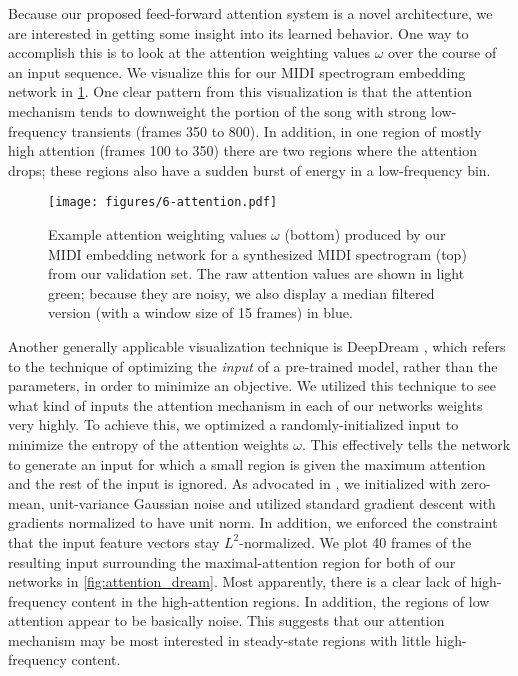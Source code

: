Because our proposed feed-forward attention system is a novel architecture, we are interested in getting some insight into its learned behavior.
One way to accomplish this is to look at the attention weighting values $\omega$ over the course of an input sequence.
We visualize this for our MIDI spectrogram embedding network in \cref{fig:attention}.
One clear pattern from this visualization is that the attention mechanism tends to downweight the portion of the song with strong low-frequency transients (frames 350 to 800).
In addition, in one region of mostly high attention (frames 100 to 350) there are two regions where the attention drops; these regions also have a sudden burst of energy in a low-frequency bin.

\begin{figure}
  \texttt{[image: figures/6-attention.pdf]}
  \caption[Example attention weighting]{Example attention weighting values $\omega$ (bottom) produced by our MIDI embedding network for a synthesized MIDI spectrogram (top) from our validation set.
The raw attention values are shown in light green; because they are noisy, we also display a median filtered version (with a window size of 15 frames) in blue.}
  \label{fig:attention}
\end{figure}

Another generally applicable visualization technique is DeepDream \cite{mordvintsev2015inceptionism}, which refers to the technique of optimizing the {\em input} of a pre-trained model, rather than the parameters, in order to minimize an objective.
We utilized this technique to see what kind of inputs the attention mechanism in each of our networks weights very highly.
To achieve this, we optimized a randomly-initialized input to minimize the entropy of the attention weights $\omega$.
This effectively tells the network to generate an input for which a small region is given the maximum attention and the rest of the input is ignored.
As advocated in \cite{mordvintsev2015inceptionism}, we initialized with zero-mean, unit-variance Gaussian noise and utilized standard gradient descent with gradients normalized to have unit norm.
In addition, we enforced the constraint that the input feature vectors stay $L^2$-normalized.
We plot 40 frames of the resulting input surrounding the maximal-attention region for both of our networks in \cref{fig:attention_dream}.
Most apparently, there is a clear lack of high-frequency content in the high-attention regions.
In addition, the regions of low attention appear to be basically noise.
This suggests that our attention mechanism may be most interested in steady-state regions with little high-frequency content.


